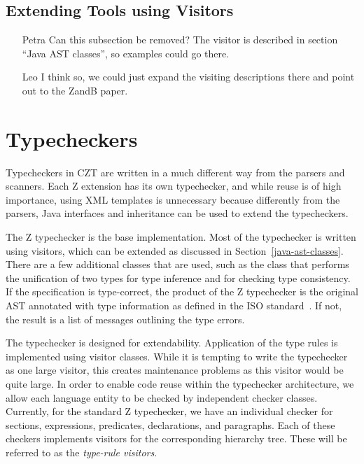\documentclass{llncs}
\begin{document}
\subsection{Extending Tools using Visitors}
\label{extending-visitors}

  \begin{itemize}
    \item[Petra] Can this subsection be removed?  The visitor is
    described in section ``Java AST classes'', so examples could go
    there.
    \item[Leo] I think so, we could just expand the visiting descriptions
        there and point out to the ZandB paper.
  \end{itemize}

\section{Typecheckers}
\label{typecheckers}

Typecheckers in CZT are written in a much different way from the parsers
and scanners. Each Z extension has its own typechecker, and while reuse
is of high importance, using XML templates is unnecessary because
differently from the parsers, Java interfaces and inheritance can be used to
extend the typecheckers.

The Z typechecker is the base implementation. Most of the typechecker
is written using visitors, which can be extended as discussed in
Section~\ref{java-ast-classes}. There are a few additional classes
that are used, such as the class that performs the unification of two
types for type inference and for checking type consistency. If the
specification is type-correct, the product of the Z typechecker is the
original AST annotated with type information as defined in the ISO
standard~\cite[Section~10]{isoz}.  If not, the result is a list of
messages outlining the type errors.

The typechecker is designed for extendability. Application of the type
rules is implemented using visitor classes. While it is tempting to
write the typechecker as one large visitor, this creates maintenance
problems as this visitor would be quite large.  In order to enable
code reuse within the typechecker architecture, we allow each language
entity to be checked by independent checker classes.  Currently, for
the standard Z typechecker, we have an individual checker for
sections, expressions, predicates, declarations, and paragraphs. Each
of these checkers implements visitors for the corresponding hierarchy
tree.  These will be referred to as the {\em type-rule visitors}.
\end{document}
